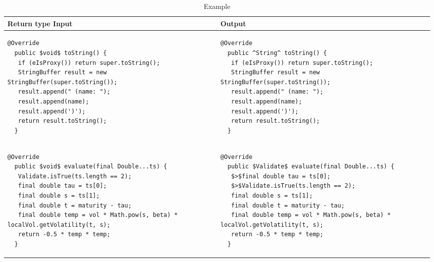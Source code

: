 \begin{landscape}
\begin{table}[p]
\begin{tabular}{ | m{10cm} | m{10cm} | }
  \hline
  Return type Input & Output \\
  \hline
  {\begin{lstlisting}[style=table]
  @Override
  public $void$ toString() {
   if (eIsProxy()) return super.toString();
   StringBuffer result = new StringBuffer(super.toString());
   result.append(" (name: ");
   result.append(name);
   result.append(')');
   return result.toString();
  }
  \end{lstlisting}} &
  {\begin{lstlisting}[style=table]
  @Override
  public ^String^ toString() {
   if (eIsProxy()) return super.toString();
   StringBuffer result = new StringBuffer(super.toString());
   result.append(" (name: ");
   result.append(name);
   result.append(')');
   return result.toString();
  }
  \end{lstlisting}} \\
  \hline
  {\begin{lstlisting}[style=table]
  @Override
  public $void$ evaluate(final Double...ts) {
   Validate.isTrue(ts.length == 2);
   final double tau = ts[0];
   final double s = ts[1];
   final double t = maturity - tau;
   final double temp = vol * Math.pow(s, beta) * localVol.getVolatility(t, s);
   return -0.5 * temp * temp;
  }
  \end{lstlisting}} &
  {\begin{lstlisting}[style=table]
  @Override
  public $Validate$ evaluate(final Double...ts) {
   $>$final double tau = ts[0];
   $>$Validate.isTrue(ts.length == 2);
   final double s = ts[1];
   final double t = maturity - tau;
   final double temp = vol * Math.pow(s, beta) * localVol.getVolatility(t, s);
   return -0.5 * temp * temp;
  }
  \end{lstlisting}} \\
  \hline
\end{tabular}
\caption{Example}
\label{return_type_showcase_table}
\end{table}


\end{landscape}
